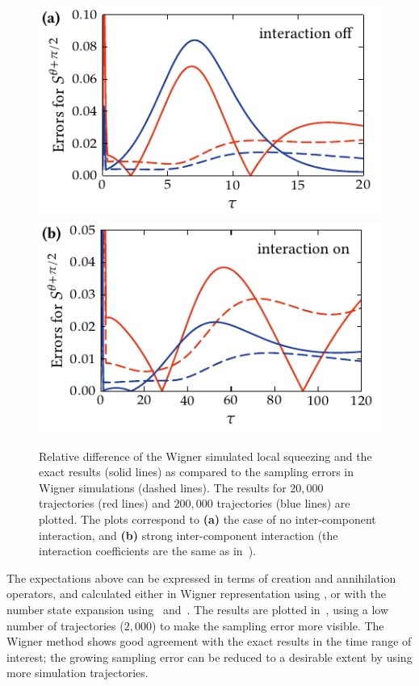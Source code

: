 \begin{figure}
    \centerline{%
    \includegraphics{figures_generated/exact/squeezing_nocc_err.pdf}%
    \includegraphics{figures_generated/exact/squeezing_cc_err.pdf}}

    \caption[Sampling and systematic errors in Wigner simulated local squeezing]{
    Relative difference of the Wigner simulated local squeezing and the exact results (solid lines) as compared to the sampling errors in Wigner simulations (dashed lines).
    The results for $20,000$ trajectories (red lines) and $200,000$ trajectories (blue lines) are plotted.
    The plots correspond to \textbf{(a)} the case of no inter-component interaction, and \textbf{(b)} strong inter-component interaction (the interaction coefficients are the same as in~).}%

    \label{fig:wigner-bec:mm:squeezing-error-comparison}
\end{figure}

The expectations above can be expressed in terms of creation and annihilation operators, and calculated either in Wigner representation using , or with the number state expansion using~ and~.
The results are plotted in~, using a low number of trajectories ($2,000$) to make the sampling error more visible.
The Wigner method shows good agreement with the exact results in the time range of interest; the growing sampling error can be reduced to a desirable extent by using more simulation trajectories.

